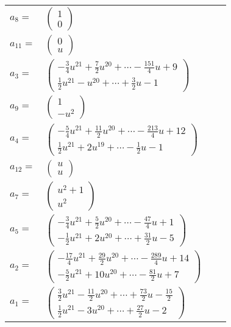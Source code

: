 \documentclass[1p]{elsarticle_modified}
\theoremstyle{definition}
\begin{document}
\begin{tabular}{m{7pt} m{180pt} m{7pt} m{180pt} }
\flushright $a_{8}=$&$\begin{pmatrix}1\\0\end{pmatrix}$ \\
\flushright $a_{11}=$&$\begin{pmatrix}0\\u\end{pmatrix}$ \\
\flushright $a_{3}=$&$\begin{pmatrix}-\frac{3}{4} u^{21}+\frac{7}{2} u^{20}+\cdots-\frac{151}{4} u+9\\\frac{1}{2} u^{21}- u^{20}+\cdots+\frac{3}{2} u-1\end{pmatrix}$ \\
\flushright $a_{9}=$&$\begin{pmatrix}1\\- u^2\end{pmatrix}$ \\
\flushright $a_{4}=$&$\begin{pmatrix}-\frac{5}{4} u^{21}+\frac{11}{2} u^{20}+\cdots-\frac{213}{4} u+12\\\frac{1}{2} u^{21}+2 u^{19}+\cdots-\frac{1}{2} u-1\end{pmatrix}$ \\
\flushright $a_{12}=$&$\begin{pmatrix}u\\u\end{pmatrix}$ \\
\flushright $a_{7}=$&$\begin{pmatrix}u^2+1\\u^2\end{pmatrix}$ \\
\flushright $a_{5}=$&$\begin{pmatrix}-\frac{3}{4} u^{21}+\frac{5}{2} u^{20}+\cdots-\frac{47}{4} u+1\\-\frac{1}{2} u^{21}+2 u^{20}+\cdots+\frac{31}{2} u-5\end{pmatrix}$ \\
\flushright $a_{2}=$&$\begin{pmatrix}-\frac{17}{4} u^{21}+\frac{29}{2} u^{20}+\cdots-\frac{289}{4} u+14\\-\frac{5}{2} u^{21}+10 u^{20}+\cdots-\frac{81}{2} u+7\end{pmatrix}$ \\
\flushright $a_{1}=$&$\begin{pmatrix}\frac{3}{2} u^{21}-\frac{11}{2} u^{20}+\cdots+\frac{73}{2} u-\frac{15}{2}\\\frac{1}{2} u^{21}-3 u^{20}+\cdots+\frac{27}{2} u-2\end{pmatrix}$ \\

\end{tabular}
\end{document}
